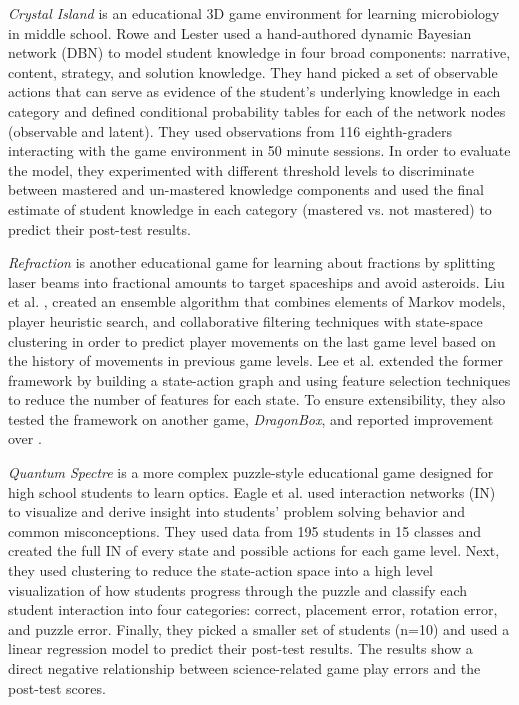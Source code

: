 \documentclass{sigchi}
\begin{document}
\textit{Crystal Island} \cite{rowe2010integrating} is an educational 3D game environment for learning microbiology in middle school. 
Rowe and Lester \cite{rowe2010modeling} used a hand-authored dynamic Bayesian network (DBN) to model student knowledge in four broad components: narrative, content, strategy, and solution knowledge. 
They hand picked a set of observable actions that can serve as evidence of the student's underlying knowledge in each category and defined conditional probability tables for each of the network nodes (observable and latent).
They used observations from 116 eighth-graders interacting with the game environment in 50 minute sessions.
In order to evaluate the model, they experimented with different threshold levels to discriminate between mastered and un-mastered knowledge components and used the final estimate of student knowledge in each category (mastered vs. not mastered) to predict their post-test results.

\textit {Refraction} \cite{andersen2010gameplay} is another educational game for learning about fractions by splitting laser beams into fractional amounts to target spaceships and avoid asteroids. 
Liu et al. \cite{liu2013predicting}, created an ensemble algorithm that combines elements of Markov models, player heuristic search, and collaborative filtering techniques with state-space clustering in order to predict player movements on the last game level based on the history of movements in previous game levels. 
Lee et al. \cite{lee2014learning} extended the former framework by building a state-action graph and using feature selection techniques to reduce the number of features for each state. 
To ensure extensibility, they also tested the framework on another game, \textit {DragonBox}, and reported improvement over \cite{liu2013predicting}.

\textit {Quantum Spectre} is a more complex puzzle-style educational game designed for high school students to learn optics. 
Eagle et al. \cite{eagle2015measuring} used interaction networks (IN) to visualize and derive insight into students' problem solving behavior and common misconceptions. 
They used data from 195 students in 15 classes and created the full IN of every state and possible actions for each game level. 
Next, they used clustering to reduce the state-action space into a high level visualization of how students progress through the puzzle and classify each student interaction into four categories: correct, placement error, rotation error, and puzzle error. 
Finally, they picked a smaller set of students (n=10) and used a linear regression model to predict their post-test results.
The results show a direct negative relationship between science-related game play errors and the post-test scores.
\end{document}

